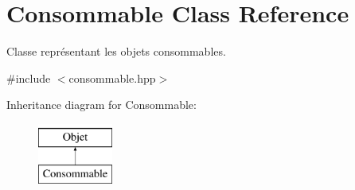 \hypertarget{class_consommable}{\section{Consommable Class Reference}
\label{class_consommable}
}


Classe représentant les objets consommables.  




{\ttfamily \#include $<$consommable.\-hpp$>$}

Inheritance diagram for Consommable\-:\begin{figure}[H]
\begin{center}
\leavevmode
\includegraphics[height=2.000000cm]{class_consommable}
\end{center}
\end{figure}
